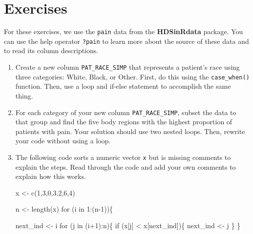 \documentclass[
  letterpaper,
]{latex/krantz}
\makeatletter
\newenvironment{Shaded}{\begin{snugshade}}{\end{snugshade}}
\newcommand{\ControlFlowTok}[1]{\textcolor[rgb]{0.00,0.23,0.31}{#1}}
\newcommand{\DecValTok}[1]{\textcolor[rgb]{0.68,0.00,0.00}{#1}}
\newcommand{\FunctionTok}[1]{\textcolor[rgb]{0.28,0.35,0.67}{#1}}
\newcommand{\NormalTok}[1]{\textcolor[rgb]{0.00,0.23,0.31}{#1}}
\newcommand{\OtherTok}[1]{\textcolor[rgb]{0.00,0.23,0.31}{#1}}
\newcommand{\SpecialCharTok}[1]{\textcolor[rgb]{0.37,0.37,0.37}{#1}}
\newenvironment{kframe}{%
\medskip{}
\setlength{\fboxsep}{.8em}
 \def\at@end@of@kframe{}%
 \ifinner\ifhmode%
  \def\at@end@of@kframe{\end{minipage}}%
  \begin{minipage}{\columnwidth}%
 \fi\fi%
 \def\FrameCommand##1{\hskip\@totalleftmargin \hskip-\fboxsep
 \colorbox{shadecolor}{##1}\hskip-\fboxsep
     \hskip-\linewidth \hskip-\@totalleftmargin \hskip\columnwidth}%
 \MakeFramed {\advance\hsize-\width
   \@totalleftmargin\z@ \linewidth\hsize
   \@setminipage}}%
 {\par\unskip\endMakeFramed%
 \at@end@of@kframe}
\renewenvironment{Shaded}{\begin{kframe}}{\end{kframe}}
\makeatother
\begin{document}
\section{Exercises}\label{exercises-11}

For these exercises, we use the
\texttt{pain} data from the
\textbf{HDSinRdata} package. You can use
the help operator \texttt{?pain} to learn more about the source of these
data and to read its column descriptions.

\begin{enumerate}
\def\labelenumi{\arabic{enumi}.}
\item
  Create a new column \texttt{PAT\_RACE\_SIMP} that represents a
  patient's race using three categories: White, Black, or Other. First,
  do this using the \texttt{case\_when()} function. Then, use a loop and
  if-else statement to accomplish the same thing.
\item
  For each category of your new column \texttt{PAT\_RACE\_SIMP}, subset
  the data to that group and find the five body regions with the highest
  proportion of patients with pain. Your solution should use two nested
  loops. Then, rewrite your code without using a loop.
\item
  The following code sorts a numeric vector \texttt{x} but is missing
  comments to explain the steps. Read through the code and add your own
  comments to explain how this works.

\begin{Shaded}
\begin{Highlighting}[]
\NormalTok{x }\OtherTok{\textless{}{-}} \FunctionTok{c}\NormalTok{(}\DecValTok{1}\NormalTok{,}\DecValTok{3}\NormalTok{,}\DecValTok{0}\NormalTok{,}\DecValTok{3}\NormalTok{,}\DecValTok{2}\NormalTok{,}\DecValTok{6}\NormalTok{,}\DecValTok{4}\NormalTok{)}

\NormalTok{n }\OtherTok{\textless{}{-}} \FunctionTok{length}\NormalTok{(x)}
\ControlFlowTok{for}\NormalTok{ (i }\ControlFlowTok{in} \DecValTok{1}\SpecialCharTok{:}\NormalTok{(n}\DecValTok{{-}1}\NormalTok{))\{}

\NormalTok{  next\_ind }\OtherTok{\textless{}{-}}\NormalTok{ i}
  \ControlFlowTok{for}\NormalTok{ (j }\ControlFlowTok{in}\NormalTok{ (i}\SpecialCharTok{+}\DecValTok{1}\NormalTok{)}\SpecialCharTok{:}\NormalTok{n)\{}
    \ControlFlowTok{if}\NormalTok{ (x[j] }\SpecialCharTok{\textless{}}\NormalTok{ x[next\_ind])\{}
\NormalTok{      next\_ind }\OtherTok{\textless{}{-}}\NormalTok{ j}
\NormalTok{    \}}
\NormalTok{  \}}


\end{Highlighting}
\end{Shaded}
\end{enumerate}
\end{document}
